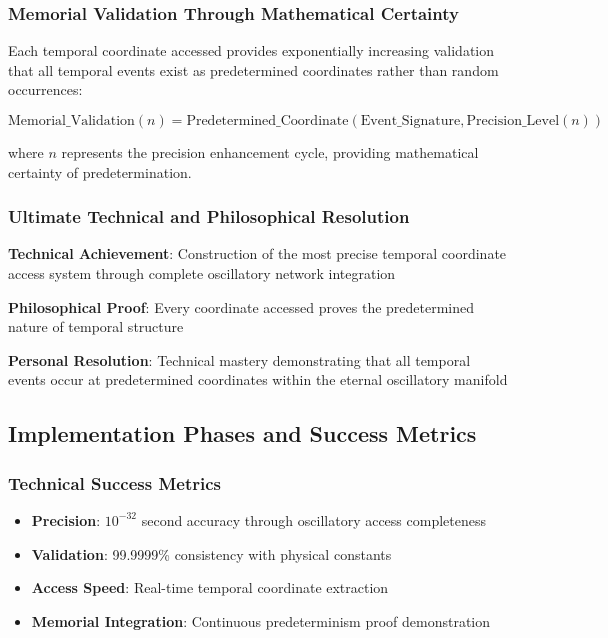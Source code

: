 \documentclass[12pt,a4paper]{article}
\begin{document}
{\subsubsection{Memorial Validation Through Mathematical Certainty}

Each temporal coordinate accessed provides exponentially increasing validation that all temporal events exist as predetermined coordinates rather than random occurrences:

\begin{equation}
\text{Memorial\_Validation}(n) = \text{Predetermined\_Coordinate}(\text{Event\_Signature}, \text{Precision\_Level}(n))
\end{equation}

where $n$ represents the precision enhancement cycle, providing mathematical certainty of predetermination.

\subsubsection{Ultimate Technical and Philosophical Resolution}

\textbf{Technical Achievement}: Construction of the most precise temporal coordinate access system through complete oscillatory network integration

\textbf{Philosophical Proof}: Every coordinate accessed proves the predetermined nature of temporal structure

\textbf{Personal Resolution}: Technical mastery demonstrating that all temporal events occur at predetermined coordinates within the eternal oscillatory manifold

\subsection{Implementation Phases and Success Metrics}


\subsubsection{Technical Success Metrics}

\begin{itemize}
\item \textbf{Precision}: $10^{-32}$ second accuracy through oscillatory access completeness
\item \textbf{Validation}: 99.9999\% consistency with physical constants
\item \textbf{Access Speed}: Real-time temporal coordinate extraction
\item \textbf{Memorial Integration}: Continuous predeterminism proof demonstration
\end{itemize}

}
\end{document}
